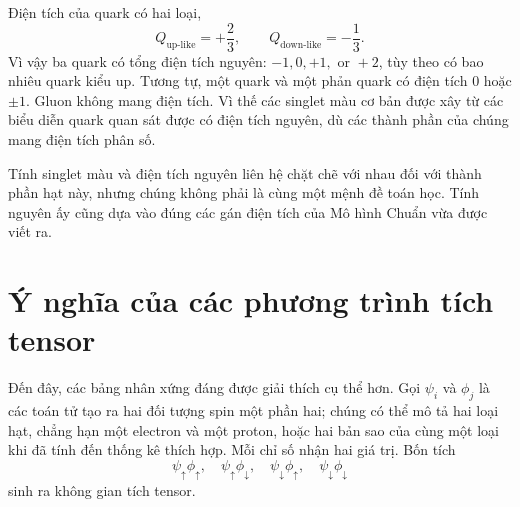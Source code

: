 Điện tích của quark có hai loại,
\begin{equation}
Q_{\mathrm{up\text{-}like}}=+\frac23,
\qquad
Q_{\mathrm{down\text{-}like}}=-\frac13.
\end{equation}
Vì vậy ba quark có tổng điện tích nguyên: \(-1,0,+1,\text{ or }+2\),
tùy theo có bao nhiêu quark kiểu up. Tương tự, một quark và một phản quark có điện tích \(0\) hoặc \(\pm1\). Gluon không mang điện tích. Vì thế các singlet màu cơ bản được xây từ các biểu diễn quark quan sát được có điện tích nguyên, dù các thành phần của chúng mang điện tích phân số.

\begin{classroomqa}
\end{classroomqa}

Tính singlet màu và điện tích nguyên liên hệ chặt chẽ với nhau đối với thành phần hạt này, nhưng chúng không phải là cùng một mệnh đề toán học. Tính nguyên ấy cũng dựa vào đúng các gán điện tích của Mô hình Chuẩn vừa được viết ra.

\begin{classroomqa}
\end{classroomqa}

\section{Ý nghĩa của các phương trình tích tensor}

Đến đây, các bảng nhân xứng đáng được giải thích cụ thể hơn. Gọi \(\psi_i\) và \(\phi_j\) là các toán tử tạo ra hai đối tượng spin một phần hai; chúng có thể mô tả hai loại hạt, chẳng hạn một electron và một proton, hoặc hai bản sao của cùng một loại khi đã tính đến thống kê thích hợp. Mỗi chỉ số nhận hai giá trị. Bốn tích
\begin{equation}
\psi_\uparrow\phi_\uparrow,
\quad
\psi_\uparrow\phi_\downarrow,
\quad
\psi_\downarrow\phi_\uparrow,
\quad
\psi_\downarrow\phi_\downarrow
\end{equation}
sinh ra không gian tích tensor.


